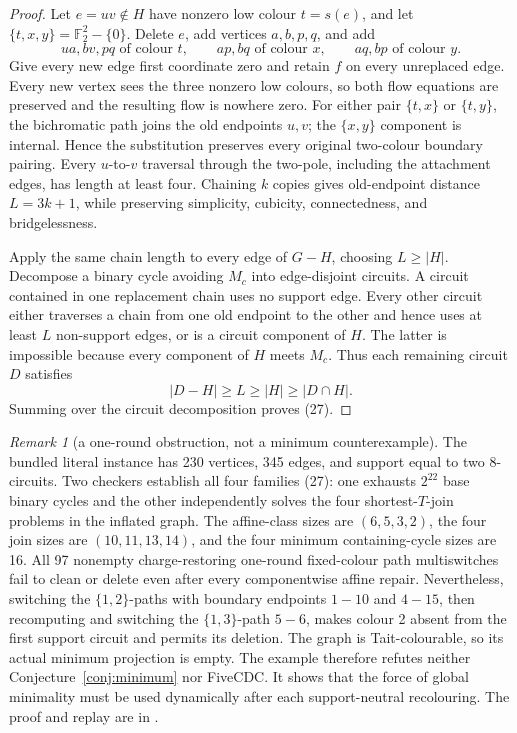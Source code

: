 \documentclass[11pt]{article}
\theoremstyle{definition}
\theoremstyle{remark}
\newtheorem{remark}[theorem]{Remark}
\newcommand{\F}{\mathbb F}
\begin{document}
\begin{proof}
Let \(e=uv\notin H\) have nonzero low colour \(t=s(e)\), and let
\(\{t,x,y\}=\F_2^2-\{0\}\).  Delete \(e\), add vertices \(a,b,p,q\), and
add
\[
 ua,bv,pq\text{ of colour }t,\qquad
 ap,bq\text{ of colour }x,\qquad aq,bp\text{ of colour }y. \tag{28}
\]
Give every new edge first coordinate zero and retain \(f\) on every
unreplaced edge.  Every new vertex sees the three nonzero low colours, so
both flow equations are preserved and the resulting flow is nowhere zero.
For either pair \(\{t,x\}\) or \(\{t,y\}\), the
bichromatic path joins the old endpoints \(u,v\); the \(\{x,y\}\)
component is internal.  Hence the substitution preserves every original
two-colour boundary pairing.  Every \(u\)-to-\(v\) traversal through the
two-pole, including the attachment edges, has length at least four.
Chaining \(k\) copies gives old-endpoint distance \(L=3k+1\), while
preserving simplicity, cubicity, connectedness, and bridgelessness.

Apply the same chain length to every edge of \(G-H\), choosing
\(L\geq|H|\).  Decompose a binary cycle avoiding \(M_c\) into
edge-disjoint circuits.  A circuit contained in one replacement chain
uses no support edge.  Every other circuit either traverses a chain from
one old endpoint to the other and hence uses at least \(L\) non-support
edges, or is a circuit component of \(H\).  The latter is impossible
because every component of \(H\) meets \(M_c\).  Thus each remaining
circuit \(D\)
satisfies
\[
 |D-H|\geq L\geq|H|\geq|D\cap H|.
\]
Summing over the circuit decomposition proves (27).
\end{proof}

\begin{remark}[a one-round obstruction, not a minimum counterexample]
The bundled literal instance has 230 vertices, 345 edges, and support
equal to two 8-circuits.  Two checkers establish all four families (27):
one exhausts \(2^{22}\) base binary cycles and the other independently
solves the four shortest-\(T\)-join problems in the inflated graph.  The
affine-class sizes are \((6,5,3,2)\), the four join sizes are
\((10,11,13,14)\), and the four minimum containing-cycle sizes are 16.
All 97 nonempty charge-restoring one-round fixed-colour path
multiswitches fail to clean or delete even after every componentwise
affine repair.  Nevertheless, switching the
\(\{1,2\}\)-paths with boundary endpoints \(1\!-\!10\) and \(4\!-\!15\),
then recomputing and switching the \(\{1,3\}\)-path \(5\!-\!6\), makes
colour 2 absent from the first support circuit and permits its deletion.
The graph is Tait-colourable, so its actual minimum projection is empty.
The example therefore refutes neither Conjecture~\ref{conj:minimum} nor
FiveCDC.  It shows that the force of global minimality must be used
dynamically after each support-neutral recolouring.  The proof and replay
are in
.
\end{remark}
\end{document}
